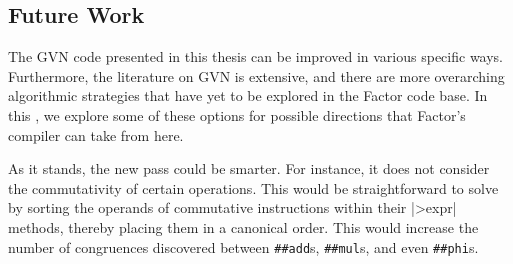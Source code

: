 \subsection{Future Work}\label{sec:vn:future}

The \gls{GVN} code presented in this thesis can be improved in various specific
ways.  Furthermore, the literature on \gls{GVN} is extensive, and there are
more overarching algorithmic strategies that have yet to be explored in the
Factor code base.  In this , we explore some of these
options for possible directions that Factor's compiler can take from here.

As it stands, the new pass could be smarter.  For instance, it does not
consider the commutativity of certain operations.  This would be
straightforward to solve by sorting the operands of commutative instructions
within their \factor|>expr| methods, thereby placing them in a canonical order.
This would increase the number of congruences discovered between \Verb|##add|s,
\Verb|##mul|s, and even \Verb|##phi|s.


